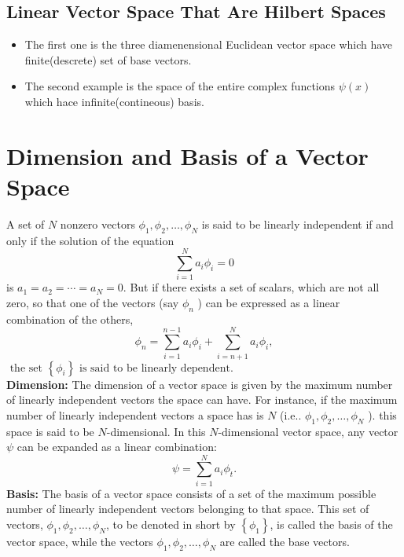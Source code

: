 \subsection{Linear Vector Space That Are Hilbert Spaces}
\begin{itemize}
	\item The first one is the three diamenensional Euclidean vector space which have finite(descrete) set of base vectors.
	\item The second example is the space of the entire complex functions $\psi(x)$ which hace infinite(contineous) basis.
\end{itemize}
\section{Dimension and Basis of a Vector Space}
A set of $N$ nonzero vectors $\phi_{1}, \phi_{2}, \ldots, \phi_{N}$ is said to be linearly independent if and only if the solution of the equation
$$
\sum_{i=1}^{N} a_{i} \phi_{i}=0
$$
is $a_{1}=a_{2}=\cdots=a_{N}=0 .$ But if there exists a set of scalars, which are not all zero, so that one of the vectors (say $\phi_{n}$ ) can be expressed as a linear combination of the others,
$$
\phi_{n}=\sum_{i=1}^{n-1} a_{i} \phi_{i}+\sum_{i=n+1}^{N} a_{i} \phi_{i},
$$
$\text { the set }\left\{\phi_{i}\right\} \text { is said to be linearly dependent. }$\\
\textbf{Dimension:} The dimension of a vector space is given by the maximum number of linearly independent vectors the space can have. For instance, if the maximum number of linearly independent vectors a space has is $N$ (i.e.. $\phi_{1}, \phi_{2}, \ldots, \phi_{N}$ ). this space is said to be $N$-dimensional. In this $N$-dimensional vector space, any vector $\psi$ can be expanded as a linear combination:
$$
\psi=\sum_{i=1}^{N} a_{i} \phi_{t} .
$$
\textbf{Basis:} The basis of a vector space consists of a set of the maximum possible number of linearly independent vectors belonging to that space. This set of vectors, $\phi_{1}, \phi_{2}, \ldots, \phi_{N}$, to be denoted in short by $\left\{\phi_{1}\right\}$, is called the basis of the vector space, while the vectors $\phi_{1}, \phi_{2}, \ldots, \phi_{N}$ are called the base vectors.
